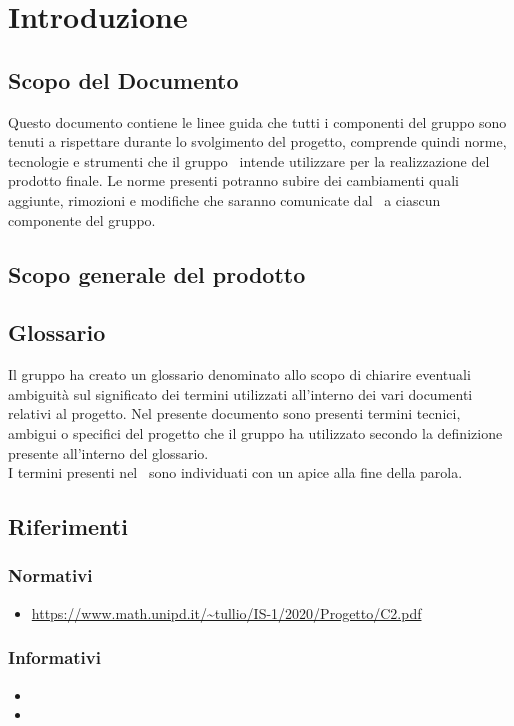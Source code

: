 \section{Introduzione}
\subsection{Scopo del Documento}\label{ScopoDocumento}
Questo documento contiene le linee guida che tutti i componenti del gruppo sono tenuti a rispettare durante lo svolgimento del progetto, comprende quindi norme, tecnologie e strumenti che il gruppo \Gruppo\ intende utilizzare per la realizzazione del prodotto finale. 
Le norme presenti potranno subire dei cambiamenti quali aggiunte, rimozioni e modifiche che saranno comunicate dal \Responsabile\ a ciascun componente del gruppo.

\subsection{Scopo generale del prodotto}

\subsection{Glossario}\label{Glossario}
Il gruppo ha creato un glossario denominato \Glossariov allo scopo di chiarire eventuali ambiguità sul significato dei termini utilizzati all'interno dei vari documenti relativi al progetto. Nel presente documento sono presenti termini tecnici, ambigui o specifici del progetto che il gruppo ha utilizzato secondo la definizione presente all'interno del glossario. \\
I termini presenti nel \Glossariov\ sono individuati con un apice  alla fine della parola.

\subsection{Riferimenti}
\subsubsection{Normativi}\label{RiferimentiNormativi}
\begin{itemize}
\item \url{https://www.math.unipd.it/~tullio/IS-1/2020/Progetto/C2.pdf}
\end{itemize}

\subsubsection{Informativi}
\begin{itemize}
\item \PdPv{}
\item \PdQv{}
\end{itemize}